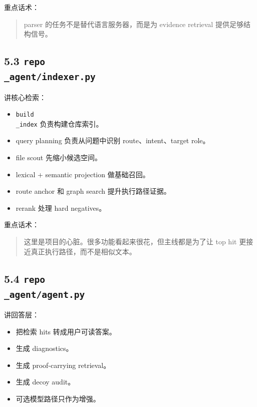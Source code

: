 \documentclass[UTF8,12pt,openany]{ctexbook}
\begin{document}
重点话术：\par

\begin{quote}
parser 的任务不是替代语言服务器，而是为 evidence retrieval 提供足够结构信号。
\end{quote}

\subsection{5.3 \texttt{repo\\_agent/indexer.py}}

讲核心检索：\par

\begin{itemize}
\item \texttt{build\\_index} 负责构建仓库索引。
\item query planning 负责从问题中识别 route、intent、target role。
\item file scout 先缩小候选空间。
\item lexical + semantic projection 做基础召回。
\item route anchor 和 graph search 提升执行路径证据。
\item rerank 处理 hard negatives。
\end{itemize}

重点话术：\par

\begin{quote}
这里是项目的心脏。很多功能看起来很花，但主线都是为了让 top hit 更接近真正执行路径，而不是相似文本。
\end{quote}

\subsection{5.4 \texttt{repo\\_agent/agent.py}}

讲回答层：\par

\begin{itemize}
\item 把检索 hits 转成用户可读答案。
\item 生成 diagnostics。
\item 生成 proof-carrying retrieval。
\item 生成 decoy audit。
\item 可选模型路径只作为增强。
\end{itemize}
\end{document}
